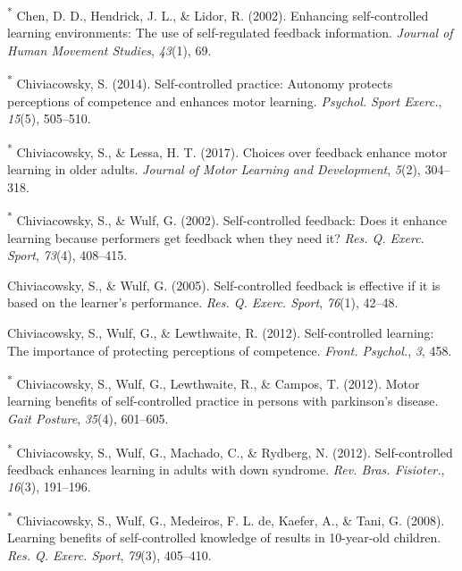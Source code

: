 \documentclass[
  english,
  man,floatsintext]{apa7}
\newlength{\cslhangindent}
\newlength{\cslentryspacingunit} %
\newenvironment{CSLReferences}[2] %
 {%
  \setlength{\parindent}{0pt}
  \ifodd #1
  \let\oldpar\par
  \def\par{\hangindent=\cslhangindent\oldpar}
  \fi
  \setlength{\parskip}{#2\cslentryspacingunit}
 }%
 {}
\begin{document}
\begin{CSLReferences}{1}{0}
\leavevmode{}%
\textsuperscript{*} Chen, D. D., Hendrick, J. L., \& Lidor, R. (2002). Enhancing self-controlled learning environments: The use of self-regulated feedback information. \emph{Journal of Human Movement Studies}, \emph{43}(1), 69.

\leavevmode{}%
\textsuperscript{*} Chiviacowsky, S. (2014). Self-controlled practice: Autonomy protects perceptions of competence and enhances motor learning. \emph{Psychol. Sport Exerc.}, \emph{15}(5), 505--510.

\leavevmode{}%
\textsuperscript{*} Chiviacowsky, S., \& Lessa, H. T. (2017). Choices over feedback enhance motor learning in older adults. \emph{Journal of Motor Learning and Development}, \emph{5}(2), 304--318.

\leavevmode{}%
\textsuperscript{*} Chiviacowsky, S., \& Wulf, G. (2002). Self-controlled feedback: Does it enhance learning because performers get feedback when they need it? \emph{Res. Q. Exerc. Sport}, \emph{73}(4), 408--415.

\leavevmode{}%
Chiviacowsky, S., \& Wulf, G. (2005). Self-controlled feedback is effective if it is based on the learner's performance. \emph{Res. Q. Exerc. Sport}, \emph{76}(1), 42--48.

\leavevmode{}%
Chiviacowsky, S., Wulf, G., \& Lewthwaite, R. (2012). Self-controlled learning: The importance of protecting perceptions of competence. \emph{Front. Psychol.}, \emph{3}, 458.

\leavevmode{}%
\textsuperscript{*} Chiviacowsky, S., Wulf, G., Lewthwaite, R., \& Campos, T. (2012). Motor learning benefits of self-controlled practice in persons with parkinson's disease. \emph{Gait Posture}, \emph{35}(4), 601--605.

\leavevmode{}%
\textsuperscript{*} Chiviacowsky, S., Wulf, G., Machado, C., \& Rydberg, N. (2012). Self-controlled feedback enhances learning in adults with down syndrome. \emph{Rev. Bras. Fisioter.}, \emph{16}(3), 191--196.

\leavevmode{}%
\textsuperscript{*} Chiviacowsky, S., Wulf, G., Medeiros, F. L. de, Kaefer, A., \& Tani, G. (2008). Learning benefits of self-controlled knowledge of results in 10-year-old children. \emph{Res. Q. Exerc. Sport}, \emph{79}(3), 405--410.


\end{CSLReferences}
\end{document}
